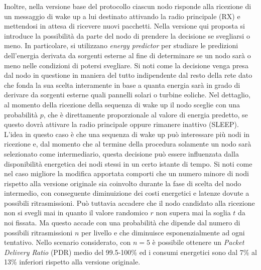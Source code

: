 \documentclass[binding=0.6cm,TFA]{sapthesis}
\begin{document}
Inoltre, nella versione base del protocollo ciascun nodo risponde alla ricezione di un messaggio di wake up a lui destinato attivando la radio principale (RX) e mettendosi
in attesa di ricevere nuovi pacchetti. Nella versione qui proposta si introduce la possibilità da parte del nodo di prendere la decisione se svegliarsi o meno.
In particolare, si utilizzano \emph{energy predictor} per studiare le predizioni dell'energia derivata da sorgenti esterne al fine di determinare se un nodo sarà o
meno nelle condizioni di potersi svegliare. Si noti come la decisione venga presa dal nodo in questione in maniera del tutto indipendente dal resto della rete dato
che fonda la sua scelta interamente in base a quanta energia sarà in grado di derivare da sorgenti esterne quali pannelli solari o turbine eoliche. Nel dettaglio,
al momento della ricezione della sequenza di wake up il nodo sceglie con una probabilità $p$, che è direttamente proporzionale al valore di energia predetto,
se questo dovrà attivare la radio principale oppure rimanere inattivo (SLEEP).\\

L'idea in questo caso è che una sequenza di wake up può interessare più nodi
in ricezione e, dal momento che al termine della procedura solamente un nodo sarà selezionato come intermediario, questa decisione può essere influenzata dalla
disponibilità energetica dei nodi stessi in un certo istante di tempo. Si noti come nel caso migliore la modifica apportata comporti che un numero minore di nodi
rispetto alla versione originale sia coinvolto durante la fase di scelta del nodo intermedio, con conseguente diminuizione dei costi energetici e latenze dovute a
possibili ritrasmissioni. Può tuttavia accadere che il nodo candidato alla ricezione non si svegli mai in quanto il valore randomico $r$ non supera mai la
soglia $t$ da noi fissata. Ma questo accade con una probabilità che dipende dal numero di possibili ritrasmissioni $n$ per livello e che diminuisce esponenzialmente
ad ogni tentativo. Nello scenario considerato, con $n=5$ è possibile ottenere un \emph{Packet Delivery Ratio} (PDR) medio del 99.5-100\% ed i consumi
energetici sono dal 7\% al 13\% inferiori rispetto alla versione originale.\\
\end{document}
